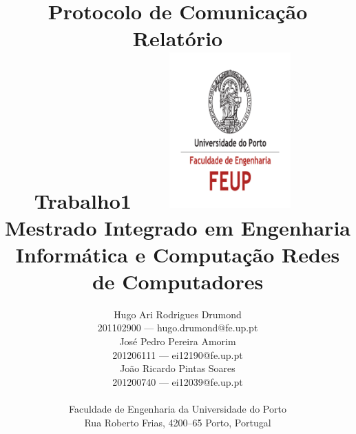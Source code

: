 \documentclass[a4paper]{article}
\begin{document}
\setlength{\textwidth}{16cm}
\setlength{\textheight}{22cm}

\title{\Huge\textbf{Protocolo de Comunicação}\linebreak\linebreak\linebreak
\Large\textbf{Relatório \\ Trabalho1}\linebreak\linebreak
\includegraphics[height=6cm, width=7cm]{feup.pdf}\linebreak \linebreak
\Large{Mestrado Integrado em Engenharia Informática e Computação} \linebreak \linebreak
\Large{Redes de Computadores}
}

\author{Hugo Ari Rodrigues Drumond \\ 201102900 --- hugo.drumond@fe.up.pt \\ José Pedro Pereira Amorim \\ 201206111 --- ei12190@fe.up.pt \\ João Ricardo Pintas Soares \\ 201200740 --- ei12039@fe.up.pt\linebreak\linebreak\linebreak \\
 \\ Faculdade de Engenharia da Universidade do Porto \\ Rua Roberto Frias, 4200--65 Porto, Portugal \linebreak\linebreak\linebreak
\linebreak\linebreak\vspace{1cm}}
\maketitle
\thispagestyle{empty}
\end{document}
